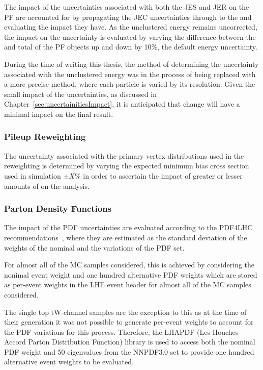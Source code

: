 The impact of the uncertainties associated with both the JES and JER on the PF \MET are accounted for by propagating the JEC uncertainties through to the \MET and evaluating the impact they have.
As the unclustered energy remains uncorrected, the impact on the \MET uncertainty is evaluated by varying the difference between the \MET and total \pT of the PF objects up and down by 10\%, the default energy uncertainty.

During the time of writing this thesis, the method of determining the uncertainty associated with the unclustered energy was in the process of being replaced with a more precise method, where each particle is varied by its resolution.
Given the small impact of the \MET uncertainties, as discussed in Chapter~\ref{sec:uncertainitiesImpact}, it is anticipated that change will have a minimal impact on the final result.

\subsubsection{Pileup Reweighting}
The uncertainty associated with the primary vertex distributions used in the \PU reweighting is determined by varying the expected minimum bias cross section used in simulation $\pm X\%$ in order to ascertain the impact of greater or lesser amounts of \PU on the analysis.

\subsubsection{Parton Density Functions}\label{subsec:pdfSysts}
The impact of the PDF uncertainties are evaluated according to the PDF4LHC recommendations~\cite{Butterworth:2015oua}, where they are estimated as the standard deviation of the weights of the nominal and the variations of the PDF set.

For almost all of the MC samples considered, this is achieved by considering the nonimal event weight and one hundred alternative PDF weights which are stored as per-event weights in the LHE 
event header for almost all of the MC samples considered.

The single top tW-channel samples are the exception to this as at the time of their generation it was not possible to generate per-event weights to account for the PDF variations for this process.
Therefore, the LHAPDF (Les Houches Accord Parton Distribution Function) library is used to access both the nominal PDF weight and 50 eigenvalues from the NNPDF3.0 set to provide one hundred alternative event weights to be evaluated.

